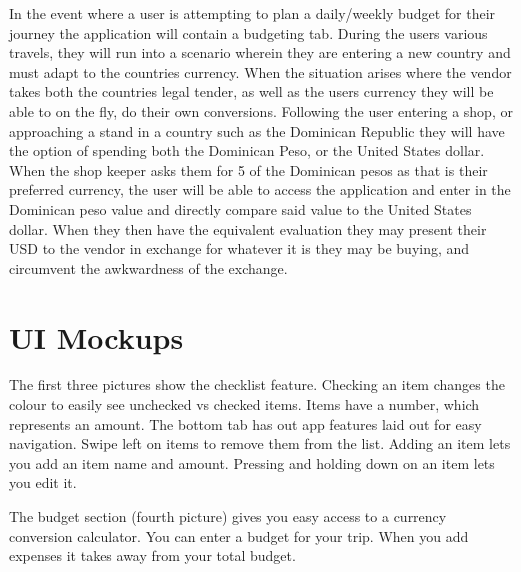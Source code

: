 \documentclass[12pt]{article}
\begin{document}
	In the event where a user is attempting to plan a daily/weekly budget for their journey the application will contain a budgeting tab.
	During the users various travels, they will run into a scenario wherein they are
	entering a new country and must adapt to the countries currency.
	When the situation arises where the vendor takes both the countries legal tender,
	as well as the users currency they will be able to on the fly, do their own conversions.
	Following the user entering a shop, or approaching a stand in a country such as the Dominican Republic
	they will have the option of spending both the Dominican	Peso, or the United States dollar.
	When the shop keeper asks them for 5 of the Dominican pesos as that is their preferred currency,
	the user will be able to access the application and enter in the Dominican peso value and directly compare said value to the United States dollar.
	When they then have the equivalent evaluation they may present their USD to the vendor in exchange for whatever it is they may be buying,
	and circumvent the awkwardness of the exchange.

\section*{UI Mockups}

    The first three pictures show the checklist feature. Checking an item changes the colour to easily see unchecked vs checked items.
    Items have a number, which represents an amount.
    The bottom tab has out app features laid out for easy navigation.
    Swipe left on items to remove them from the list.
    Adding an item lets you add an item name and amount.
    Pressing and holding down on an item lets you edit it.

    The budget section (fourth picture) gives you easy access to a currency conversion calculator.
    You can enter a budget for your trip.
    When you add expenses it takes away from your total budget.
\end{document}
